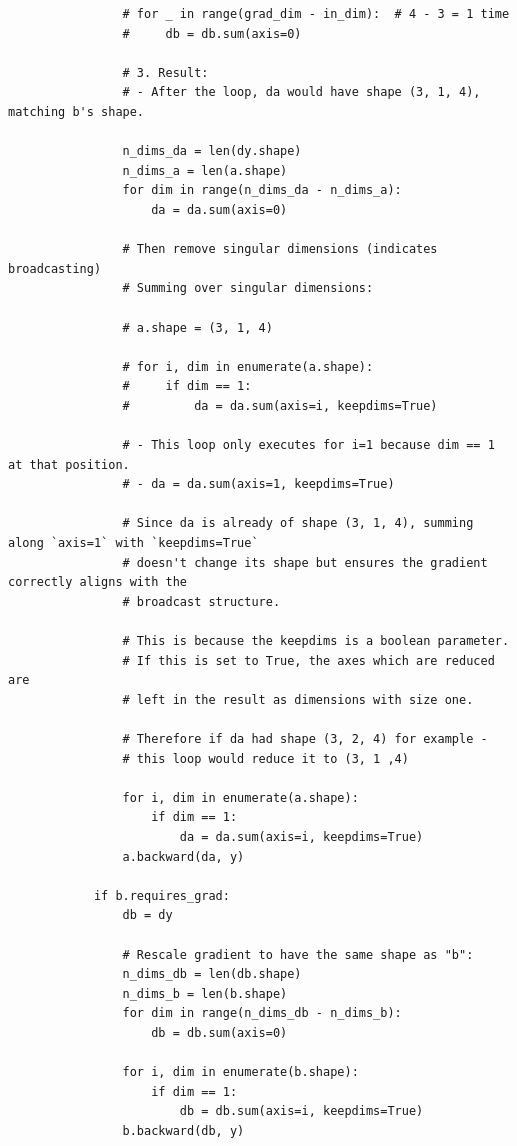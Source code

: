\documentclass{article}
\begin{document}
\begin{verbatim}
                # for _ in range(grad_dim - in_dim):  # 4 - 3 = 1 time
                #     db = db.sum(axis=0)

                # 3. Result:
                # - After the loop, da would have shape (3, 1, 4), matching b's shape.

                n_dims_da = len(dy.shape)
                n_dims_a = len(a.shape)
                for dim in range(n_dims_da - n_dims_a):
                    da = da.sum(axis=0)

                # Then remove singular dimensions (indicates broadcasting)
                # Summing over singular dimensions:

                # a.shape = (3, 1, 4)

                # for i, dim in enumerate(a.shape):
                #     if dim == 1:
                #         da = da.sum(axis=i, keepdims=True)

                # - This loop only executes for i=1 because dim == 1 at that position.
                # - da = da.sum(axis=1, keepdims=True)

                # Since da is already of shape (3, 1, 4), summing along `axis=1` with `keepdims=True`
                # doesn't change its shape but ensures the gradient correctly aligns with the
                # broadcast structure.

                # This is because the keepdims is a boolean parameter.
                # If this is set to True, the axes which are reduced are
                # left in the result as dimensions with size one.

                # Therefore if da had shape (3, 2, 4) for example -
                # this loop would reduce it to (3, 1 ,4)

                for i, dim in enumerate(a.shape):
                    if dim == 1:
                        da = da.sum(axis=i, keepdims=True)
                a.backward(da, y)

            if b.requires_grad:
                db = dy

                # Rescale gradient to have the same shape as "b":
                n_dims_db = len(db.shape)
                n_dims_b = len(b.shape)
                for dim in range(n_dims_db - n_dims_b):
                    db = db.sum(axis=0)

                for i, dim in enumerate(b.shape):
                    if dim == 1:
                        db = db.sum(axis=i, keepdims=True)
                b.backward(db, y)



\end{verbatim}
\end{document}
